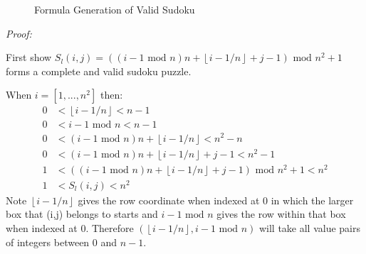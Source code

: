 \documentclass[a4paper,11pt]{report}
\newcounter{row}
\newcounter{col}
\newcounter{rowa}
\newcounter{cola}
\newcommand\setrow[9]{
  \setcounter{col}{1}
  \foreach \n in {#1, #2, #3, #4, #5, #6, #7, #8, #9} {
    \edef\x{\value{col} - 0.5}
    \edef\y{9.5 - \value{row}}
    \node[anchor=center] at (\x, \y) {\n};
    \stepcounter{col}
  }
  \stepcounter{row}
}
\newcommand\setrowa[4]{
  \setcounter{cola}{1}
  \foreach \n in {#1, #2, #3, #4} {
    \edef\x{\value{cola} - 0.5}
    \edef\y{4.5 - \value{rowa}}
    \node[anchor=center] at (\x, \y) {\n};
    \stepcounter{cola}
  }
  \stepcounter{rowa}
}
\begin{document}
\begin{figure}[h]
\centering
{}
\caption{Formula Generation of Valid Sudoku}
\label{formula}
\end{figure}

\textit{Proof:}

First show $S_l(i,j)=((i-1 \text{ mod } n)n + \left\lfloor{i-1/n}\right\rfloor+j-1)\text{ mod } n^2 +1$ forms a complete and valid sudoku puzzle.

When $i=[1,...,n^2]$ then:
\begin{align}
	0&<\left\lfloor{i-1/n}\right\rfloor<n-1\\
	0&<i-1 \text{ mod } n<n-1\\
	0&<(i-1 \text{ mod } n)n + \left\lfloor{i-1/n}\right\rfloor<n^2-n\\
	0&<(i-1 \text{ mod } n)n + \left\lfloor{i-1/n}\right\rfloor+j-1<n^2-1\\
	1&<((i-1 \text{ mod } n)n + \left\lfloor{i-1/n}\right\rfloor+j-1)\text{ mod } n^2 +1<n^2\\
	1&<S_l(i,j)<n^2
\end{align} 
Note $\left\lfloor{i-1/n}\right\rfloor$ gives the row coordinate when indexed at 0 in which the larger box that (i,j) belongs to starts and $i-1 \text{ mod } n$ gives the row within that box when indexed at 0. Therefore $(\left\lfloor{i-1/n}\right\rfloor,i-1 \text{ mod } n)$ will take all value pairs of integers between 0 and $n-1$.
\end{document}
